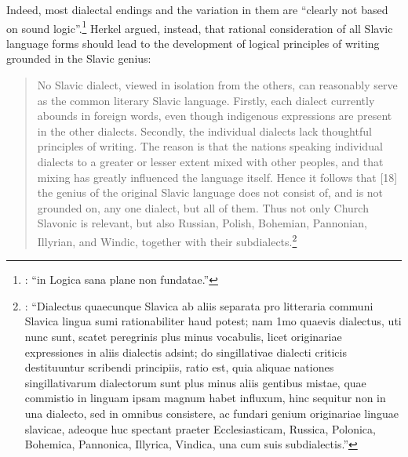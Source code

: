 \noindent Indeed, most dialectal endings and the variation in them are “clearly not based on sound logic”.\footnote{\citet[46]{herkel_elementa_1826}: “in Logica sana plane non fundatae.”} Herkel argued, instead, that rational consideration of all Slavic language forms should lead to the development of logical principles of writing grounded in the Slavic genius:

\begin{quote}
    No Slavic dialect, viewed in isolation from the others, can reasonably serve as the common literary Slavic language. Firstly, each dialect currently \linebreak{}abounds in foreign words, even though indigenous expressions are present in the other dialects. Secondly, the individual dialects lack thoughtful principles of writing. The reason is that the nations speaking individual dialects to a greater or lesser extent mixed with other peoples, and that mixing has greatly influenced the language itself. Hence it follows that [18] the genius of the original Slavic language does not consist of, and is not grounded on, any one dialect, but all of them. Thus not only Church Slavonic is relevant, but also Russian, Polish, Bohemian, Pannonian, Illyrian, and Windic, together with their subdialects.\footnote{\citet[17--18]{herkel_elementa_1826}: “Dialectus quaecunque Slavica ab aliis separata pro litteraria communi Slavica lingua sumi rationabiliter haud potest; nam 1mo quaevis dialectus, uti nunc sunt, scatet peregrinis plus minus vocabulis, licet originariae expressiones in aliis dialectis adsint; do singillativae dialecti criticis destituuntur scribendi principiis, ratio est, quia aliquae nationes singillativarum dialectorum sunt plus minus aliis gentibus mistae, quae commistio in linguam ipsam magnum habet influxum, hinc sequitur non in una dialecto, sed in omnibus consistere, ac fundari genium originariae linguae slavicae, adeoque huc spectant praeter Ecclesiasticam, Russica, Polonica, Bohemica, Pannonica, Illyrica, Vindica, una cum suis subdialectis.”}
\end{quote}

